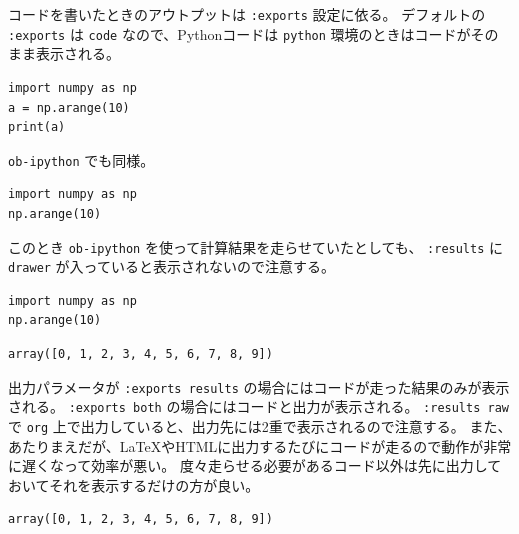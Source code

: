 \documentclass[a4paper, 10pt, notitlepage, uplatex, dvipdfmx]{jsarticle}
\begin{document}
コードを書いたときのアウトプットは \texttt{:exports} 設定に依る。
デフォルトの \texttt{:exports} は \texttt{code} なので、Pythonコードは \texttt{python} 環境のときはコードがそのまま表示される。
\begin{verbatim}
import numpy as np
a = np.arange(10)
print(a)
\end{verbatim}

\texttt{ob-ipython} でも同様。
\begin{verbatim}
import numpy as np
np.arange(10)
\end{verbatim}

このとき \texttt{ob-ipython} を使って計算結果を走らせていたとしても、 \texttt{:results} に \texttt{drawer} が入っていると表示されないので注意する。
\begin{verbatim}
import numpy as np
np.arange(10)
\end{verbatim}

\begin{verbatim}
array([0, 1, 2, 3, 4, 5, 6, 7, 8, 9])
\end{verbatim}


出力パラメータが \texttt{:exports results} の場合にはコードが走った結果のみが表示される。
\texttt{:exports both} の場合にはコードと出力が表示される。
\texttt{:results raw} で \texttt{org} 上で出力していると、出力先には2重で表示されるので注意する。
また、あたりまえだが、\LaTeX{}やHTMLに出力するたびにコードが走るので動作が非常に遅くなって効率が悪い。
度々走らせる必要があるコード以外は先に出力しておいてそれを表示するだけの方が良い。

\begin{verbatim}
array([0, 1, 2, 3, 4, 5, 6, 7, 8, 9])
\end{verbatim}
\end{document}
